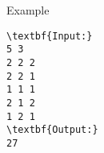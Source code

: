 Example
\begin{verbatim}
\textbf{Input:}
5 3
2 2 2
2 2 1
1 1 1
2 1 2
1 2 1
\textbf{Output:} 
27\end{verbatim}